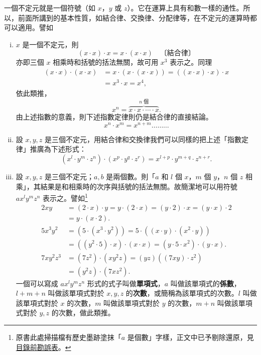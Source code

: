 一個不定元就是一個符號（如 $x$，$y$ 或 $z$）。它在運算上具有和數一樣的通性。所以，前面所講到的基本性質，如結合律、交換律、分配律等，在不定元的運算時都可以適用。譬如
\begin{enumerate}[(i)]
  \item $x$ 是一個不定元，則
  \begin{equation*}
    (x \cdot x) \cdot x = x \cdot (x \cdot x) \quad \text{〔結合律〕}
  \end{equation*}
  亦即三個 $x$ 相乘時和括號的括法無關，故可用 $x^3$ 表示之。同理
  \begin{align*}
    (x \cdot x) \cdot (x \cdot x) &= x \cdot (x \cdot (x \cdot x)) = ((x \cdot x) \cdot x) \cdot x \\
    &= x^3 \cdot x = x^4,
  \end{align*}
  依此類推，
  \begin{equation*}
    x^n = \overbrace{x \cdot x \cdot \cdots \cdot x}^{n\text{ 個}}.
  \end{equation*}
  由上述指數的意義，則下述指數定律則仍是結合律的直接結論。
  \begin{equation}\label{eq:exp_rule_1}
    x^n \cdot x^m = x^{n+m} \dots\dots\dots
  \end{equation}

  \item 設 $x, y, z$ 是三個不定元，用結合律和交換律我們可以同樣的把上述「指數定律」推廣為下述形式：
  \begin{equation}\label{eq:exp_rule_multivar}
    (x^l \cdot y^m \cdot z^n) \cdot (x^p \cdot y^q \cdot z^r) = x^{l+p} \cdot y^{m+q} \cdot z^{n+r}.
  \end{equation}

  \item 設 $x, y, z$ 是三個不定元；$a, b$ 是兩個數。則「$a$ 和 $l$ 個 $x$，$m$ 個 $y$，$n$ 個 $z$ 相乘」，其結果是和相乘時的次序與括號的括法無關。故簡潔地可以用符號 $a x^l y^m z^n$ 表示之。譬如\footnote{原書此處掃描檔有歷史墨跡塗抹「$a$ 是個數」字樣，正文中已予剔除還原，見\hyperref[sec:master_errata_notes]{目錄前勘誤表}。}
  \begin{align*}
    2xy &= (2 \cdot x) \cdot y = y \cdot (2 \cdot x) = (y \cdot 2) \cdot x = (y \cdot x) \cdot 2 \\
    &= y \cdot (x \cdot 2). \\
    5x^3 y^2 &= (5 \cdot (x^3 \cdot y^2)) = 5 \cdot ((x \cdot y) \cdot (x^2 \cdot y)) \\
    &= ((y^2 \cdot 5) \cdot x) \cdot (x \cdot x) = (y \cdot 5 \cdot x^2) \cdot (y \cdot x). \\
    7x y^2 z^3 &= (7z^2) \cdot (x y^2 z) = (yz)((7xy) \cdot z^2) \\
    &= (y^2 z) \cdot (7xz^2).
  \end{align*}
  一個可以寫成 $a x^l y^m z^n$ 形式的式子叫做\textbf{單項式}，$a$ 叫做該單項式的\textbf{係數}，$l+m+n$ 叫做該單項式對於 $x, y, z$ 的\textbf{次數}，或簡稱為該單項式的次數。$l$ 叫做該單項式對於 $x$ 的次數，$m$ 叫做該單項式對於 $y$ 的次數，$m+n$ 叫做該單項式對於 $y, z$ 的次數，做此類推。


\end{enumerate}
